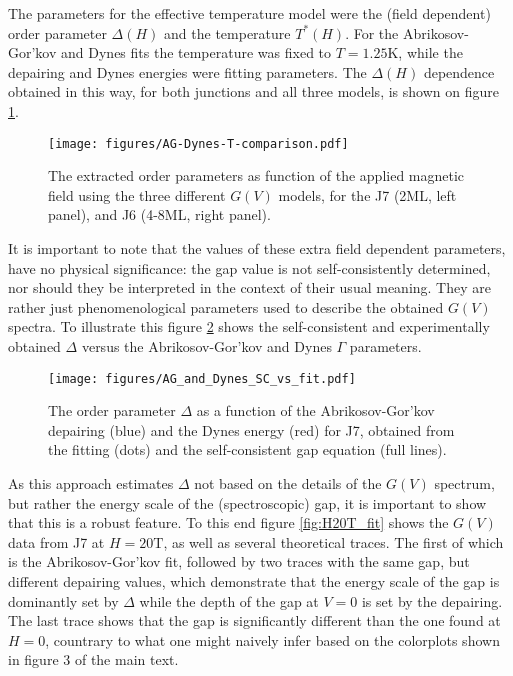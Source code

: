 \documentclass[showpacs,superscriptaddress,onecolumn,prb]{revtex4}
\begin{document}
The parameters for the effective temperature model were the (field dependent) order parameter $\Delta(H)$ and the temperature $T^*(H)$. For the Abrikosov-Gor'kov and Dynes fits the temperature was fixed to $T=1.25\mathrm{K}$, while the depairing and Dynes energies were fitting parameters. The $\Delta(H)$ dependence obtained in this way, for both junctions and all three models, is shown on figure \ref{fig:AG-Dynes-T}.

\begin{figure}[h]
	\centering
	\texttt{[image: figures/AG-Dynes-T-comparison.pdf]}
	\caption{The extracted order parameters as function of the applied magnetic field using the three different $G(V)$ models, for the J7 (2ML, left panel), and J6 (4-8ML, right panel).
	}
	\label{fig:AG-Dynes-T}
\end{figure}

It is important to note that the values of these extra field dependent parameters, have no physical significance: the gap value is not self-consistently determined, nor should they be interpreted in the context of their usual meaning. They are rather just phenomenological parameters used to describe the obtained $G(V)$ spectra. To illustrate this figure \ref{fig:AG_and_Dynes_SC_vs_fit} shows the self-consistent and experimentally obtained $\Delta$ versus the Abrikosov-Gor'kov and Dynes $\Gamma$ parameters. 

\begin{figure}[h]
	\centering
	\texttt{[image: figures/AG\_and\_Dynes\_SC\_vs\_fit.pdf]}
	\caption{The order parameter $\Delta$ as a function of the Abrikosov-Gor'kov depairing (blue) and the Dynes energy (red) for J7, obtained from the fitting (dots) and the self-consistent gap equation (full lines).
	}
	\label{fig:AG_and_Dynes_SC_vs_fit}
\end{figure}


As this approach estimates $\Delta$ not based on the details of the $G(V)$ spectrum, but rather the energy scale of the (spectroscopic) gap, it is important to show that this is a robust feature. To this end figure \ref{fig:H20T_fit} shows the $G(V)$ data from J7 at $H=20\mathrm{T}$, as well as several theoretical traces. The first of which is the Abrikosov-Gor'kov fit, followed by two traces with the same gap, but different depairing values, which demonstrate that the energy scale of the gap is dominantly set by $\Delta$ while the depth of the gap at $V=0$ is set by the depairing. The last trace shows that the gap is significantly different than the one found at $H=0$, countrary to what one might naively infer based on the colorplots shown in figure 3 of the main text.
\end{document}
